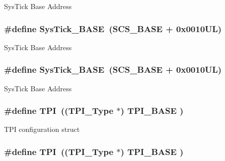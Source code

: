Sys\-Tick Base Address \hypertarget{group___c_m_s_i_s__core__base_ga58effaac0b93006b756d33209e814646}{
\subsubsection[{Sys\-Tick\-\_\-\-B\-A\-S\-E}]{\setlength{\rightskip}{0pt plus 5cm}\#define Sys\-Tick\-\_\-\-B\-A\-S\-E~({\bf S\-C\-S\-\_\-\-B\-A\-S\-E} +  0x0010\-U\-L)}}\label{group___c_m_s_i_s__core__base_ga58effaac0b93006b756d33209e814646}
Sys\-Tick Base Address \hypertarget{group___c_m_s_i_s__core__base_ga58effaac0b93006b756d33209e814646}{
\subsubsection[{Sys\-Tick\-\_\-\-B\-A\-S\-E}]{\setlength{\rightskip}{0pt plus 5cm}\#define Sys\-Tick\-\_\-\-B\-A\-S\-E~({\bf S\-C\-S\-\_\-\-B\-A\-S\-E} +  0x0010\-U\-L)}}\label{group___c_m_s_i_s__core__base_ga58effaac0b93006b756d33209e814646}
Sys\-Tick Base Address \hypertarget{group___c_m_s_i_s__core__base_ga8b4dd00016aed25a0ea54e9a9acd1239}{
\subsubsection[{T\-P\-I}]{\setlength{\rightskip}{0pt plus 5cm}\#define T\-P\-I~(({\bf T\-P\-I\-\_\-\-Type}       $\ast$)     {\bf T\-P\-I\-\_\-\-B\-A\-S\-E}      )}}\label{group___c_m_s_i_s__core__base_ga8b4dd00016aed25a0ea54e9a9acd1239}
T\-P\-I configuration struct \hypertarget{group___c_m_s_i_s__core__base_ga8b4dd00016aed25a0ea54e9a9acd1239}{
\subsubsection[{T\-P\-I}]{\setlength{\rightskip}{0pt plus 5cm}\#define T\-P\-I~(({\bf T\-P\-I\-\_\-\-Type}       $\ast$)     {\bf T\-P\-I\-\_\-\-B\-A\-S\-E}      )}}\label{group___c_m_s_i_s__core__base_ga8b4dd00016aed25a0ea54e9a9acd1239}
